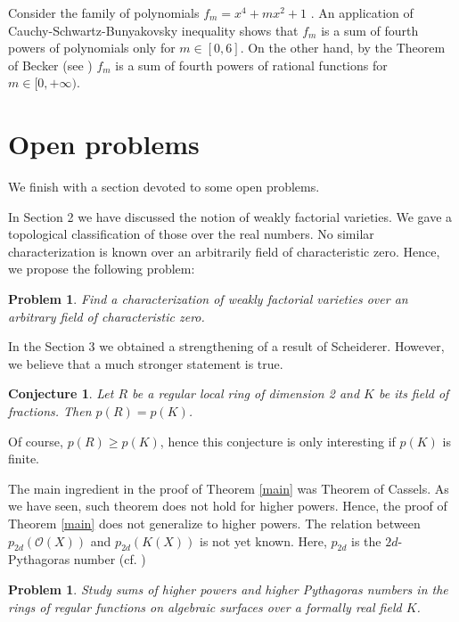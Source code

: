 \documentclass[12pt,reqno]{amsart}   	%
\theoremstyle{obs}
\theoremstyle{prob}
\newtheorem{prob}[thm]{Problem}
\theoremstyle{conj}
\newtheorem{conj}[thm]{Conjecture}
\theoremstyle{remark}
\newcommand{\OO}{\mathcal{O}}
\begin{document}
Consider the family of polynomials $f_m=x^4+mx^2+1$ \cite[Exercise 7.4.4]{pd2001}. An  application of Cauchy-Schwartz-Bunyakovsky inequality shows that $f_m$ is a sum of fourth powers of polynomials only for $m \in [0,6]$. On the other hand, by the Theorem of Becker (see \cite{becker1982, clpr1996}) $f_m$ is a sum of fourth powers of rational functions for $m \in [0, +\infty)$.




\section{Open problems}\label{sec:open problems}
We finish with a section devoted to some open problems.

In  Section 2 we have discussed the notion of weakly factorial varieties. We gave a topological classification of those over the real numbers. No similar characterization is known over an arbitrarily field of characteristic zero. Hence, we propose the following problem:

\begin{prob}
Find a characterization of weakly factorial varieties over an arbitrary field of characteristic zero.

\end{prob}
In the Section 3 we obtained a strengthening of a result of Scheiderer. However, we believe that a much stronger statement is true.
\begin{conj}
Let $R$ be a regular local ring of dimension 2 and $K$ be its field of fractions. Then $p(R)=p(K)$.

\end{conj}
Of course, $p(R)\geq p(K)$, hence this conjecture is only interesting if $p(K)$ is finite.


The main ingredient in the proof of Theorem \ref{main} was Theorem of Cassels. As we have seen, such theorem does not hold for higher powers. Hence, the proof of Theorem \ref{main} does not generalize to higher powers. The relation between $p_{2d}(\OO(X))$ and $p_{2d}(K(X))$ is not yet known. Here, $p_{2d}$ is the $2d$-Pythagoras number (cf. \cite{kv2023})

\begin{prob}
Study sums of higher powers and higher Pythagoras numbers in the rings of regular functions on algebraic surfaces over a formally real field $K$.

\end{prob}
\end{document}

